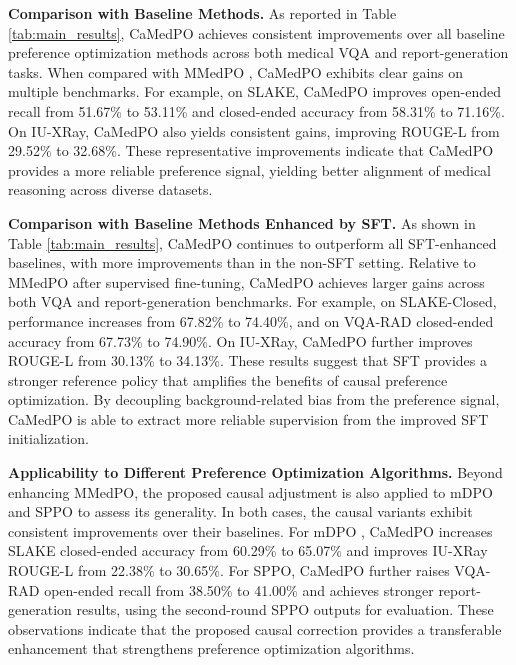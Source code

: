 \noindent\textbf{Comparison with Baseline Methods.}
As reported in Table \ref{tab:main_results}, CaMedPO achieves consistent improvements over all baseline preference optimization methods across both medical VQA and report-generation tasks. When compared with MMedPO \cite{Zhu2025MMedPO}, CaMedPO exhibits clear gains on multiple benchmarks. For example, on SLAKE, CaMedPO improves open-ended recall from 51.67\% to 53.11\% and closed-ended accuracy from 58.31\% to 71.16\%. On IU-XRay, CaMedPO also yields consistent gains, improving ROUGE-L from 29.52\% to 32.68\%. These representative improvements indicate that CaMedPO provides a more reliable preference signal, yielding better alignment of medical reasoning across diverse datasets.

\noindent\textbf{Comparison with Baseline Methods Enhanced by SFT.}
As shown in Table \ref{tab:main_results}, CaMedPO continues to outperform all SFT-enhanced baselines, with more improvements than in the non-SFT setting. Relative to MMedPO \cite{Zhu2025MMedPO} after supervised fine-tuning, CaMedPO achieves larger gains across both VQA and report-generation benchmarks. For example, on SLAKE-Closed, performance increases from 67.82\% to 74.40\%, and on VQA-RAD closed-ended accuracy from 67.73\% to 74.90\%. On IU-XRay, CaMedPO further improves ROUGE-L from 30.13\% to 34.13\%. These results suggest that SFT provides a stronger reference policy that amplifies the benefits of causal preference optimization. By decoupling background-related bias from the preference signal, CaMedPO is able to extract more reliable supervision from the improved SFT initialization.

\noindent\textbf{Applicability to Different Preference Optimization Algorithms.} Beyond enhancing MMedPO, the proposed causal adjustment is also applied to mDPO and SPPO to assess its generality. In both cases, the causal variants exhibit consistent improvements over their baselines. For mDPO \cite{wang2024mdpo}, CaMedPO increases SLAKE closed-ended accuracy from 60.29\% to 65.07\% and improves IU-XRay ROUGE-L from 22.38\% to 30.65\%. For SPPO, CaMedPO further raises VQA-RAD open-ended recall from 38.50\% to 41.00\% and achieves stronger report-generation results, using the second-round SPPO outputs for evaluation. These observations indicate that the proposed causal correction provides a transferable enhancement that strengthens preference optimization algorithms.



